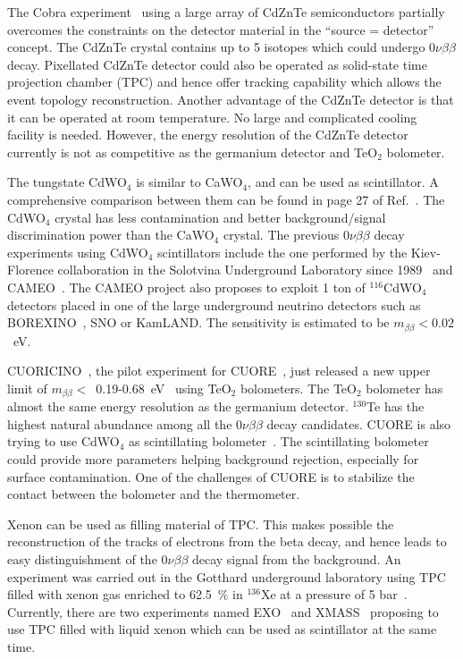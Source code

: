 The Cobra experiment~\cite{Zub01, Ell02, Kie03} using a large array of CdZnTe semiconductors partially overcomes the constraints on the detector material in the ``source = detector'' concept. The CdZnTe crystal contains up to 5 isotopes which could undergo $0\nu\beta\beta$ decay. Pixellated CdZnTe detector could also be operated as solid-state time projection chamber (TPC) and hence offer tracking capability which allows the event topology reconstruction. Another advantage of the CdZnTe detector is that it can be operated at room temperature. No large and complicated cooling facility is needed. However, the energy resolution of the CdZnTe detector currently is not as competitive as the germanium detector and TeO$_{2}$ bolometer.

The tungstate CdWO$_{4}$ is similar to CaWO$_{4}$, and can be used as scintillator. A comprehensive comparison between them can be found in page 27 of Ref.~\cite{Avi05}. The CdWO$_{4}$ crystal has less contamination and better background/signal discrimination power than the CaWO$_{4}$ crystal. The previous $0\nu\beta\beta$ decay experiments using CdWO$_{4}$ scintillators include the one performed by the Kiev-Florence collaboration in the Solotvina Underground Laboratory since 1989~\cite{Dan00, Dan03} and CAMEO~\cite{Bel00, Bel01}. The CAMEO project also proposes to exploit 1 ton of $^{116}$CdWO$_{4}$ detectors placed in one of the large underground neutrino detectors such as BOREXINO~\cite{Arp08}, SNO or KamLAND. The sensitivity is estimated to be $m_{\beta\beta} < 0.02$~eV.

CUORICINO~\cite{Pre04}, the pilot experiment for CUORE~\cite{Arn04, Ard05}, just released a new upper limit of $m_{\beta\beta} <$~0.19-0.68~eV~\cite{Arn08} using TeO$_{2}$ bolometers. The TeO$_{2}$ bolometer has almost the same energy resolution as the germanium detector. $^{130}$Te has the highest natural abundance among all the $0\nu\beta\beta$ decay candidates. CUORE is also trying to use CdWO$_{4}$ as scintillating bolometer~\cite{Gir08}. The scintillating bolometer could provide more parameters helping background rejection, especially for surface contamination. One of the challenges of CUORE is to stabilize the contact between the bolometer and the thermometer.

Xenon can be used as filling material of TPC. This makes possible the reconstruction of the tracks of electrons from the beta decay, and hence leads to easy distinguishment of the $0\nu\beta\beta$ decay signal from the background. An experiment was carried out in the Gotthard underground laboratory using TPC filled with xenon gas enriched to 62.5~\% in $^{136}$Xe at a pressure of 5 bar~\cite{Lue98}. Currently, there are two experiments named EXO~\cite{Dan00} and XMASS~\cite{Kim05} proposing to use TPC filled with liquid xenon which can be used as scintillator at the same time.

